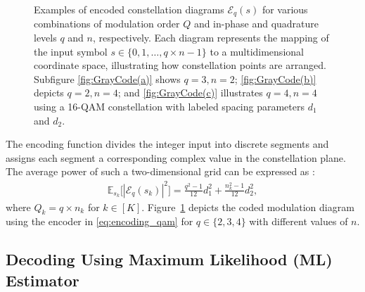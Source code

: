 \documentclass[journal,12pt,onecolumn,draftclsnofoot]{IEEEtran}
\theoremstyle{definition}
\begin{document}
\begin{figure}[t]
{
}



\caption{Examples of encoded constellation diagrams \( \mathscr{E}_q(s) \) for various combinations of modulation order \( Q \) and in-phase and quadrature levels $q$ and $n$, respectively. Each diagram represents the mapping of the input symbol \( s \in \{0,1,\ldots,q\times n-1\} \) to a multidimensional coordinate space, illustrating how constellation points are arranged. Subfigure \ref{fig:GrayCode(a)} shows \( q=3, n=2 \); \ref{fig:GrayCode(b)} depicts \( q=2, n=4 \); and \ref{fig:GrayCode(c)} illustrates \( q=4, n=4 \) using a 16-QAM constellation with labeled spacing parameters \( d_1 \) and \( d_2 \).}
    \label{fig:GrayCode}
\end{figure}%



The encoding function divides the integer input into discrete segments and assigns each segment a corresponding complex value in the constellation plane.  The average power of such a two-dimensional grid can be expressed as \cite{goldsmith2005wireless}:
\begin{align}
\label{eq:energy_conste}
\mathbb{E}_{s_k}\big[|\mathscr{E}_q(s_k)|^2\big] = \frac{q^2-1}{12}d_1^2 + \frac{n_k^2-1}{12}d_2^2,
\end{align}
where $Q_k=q\times n_k$ for $k\in [K]$. Figure~\ref{fig:GrayCode} depicts the coded modulation diagram using the encoder in \eqref{eq:encoding_qam} for $q\in \{2,3,4\}$ with different values of $n$. 

\subsection{Decoding Using Maximum Likelihood (ML) Estimator}\label{sec:MLdecoder-Est}
\end{document}
